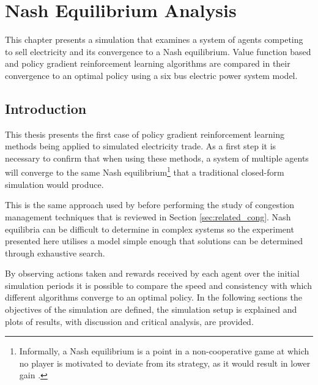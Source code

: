 \chapter{Nash Equilibrium Analysis}
\label{ch:nashanalysis}
This chapter presents a simulation that examines a system of agents competing to
sell electricity and its convergence to a Nash equilibrium.  Value function
based and policy gradient reinforcement learning algorithms are compared in
their convergence to an optimal policy using a six bus electric power system
model.

\section{Introduction}
This thesis presents the first case of policy gradient reinforcement learning
methods being applied to simulated electricity trade.  As a first step it is
necessary to confirm that when using these methods, a system of multiple agents
will converge to the same Nash equilibrium\footnote{Informally, a Nash
equilibrium is a point in a non-cooperative game at which no player is
motivated to deviate from its strategy, as it would result in lower gain
\cite{nash50,nash51}.} that a traditional closed-form simulation would produce.

This is the same approach used by  before performing the
study of congestion management techniques that is reviewed in Section
\ref{sec:related_cong}.  Nash equilibria can be difficult
to determine in complex systems so the experiment presented here utilises a
model simple enough that solutions can be determined through exhaustive search.

By observing actions taken and rewards received by each agent over the
initial simulation periods it is possible to compare the speed and consistency
with which different algorithms converge to an optimal policy. In the following
sections the objectives of the simulation are defined, the simulation setup
is explained and plots of results, with discussion and critical analysis, are
provided.

